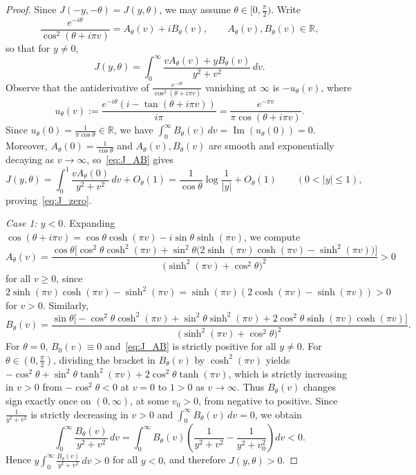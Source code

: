 \documentclass[11pt,a4paper]{amsart}
\theoremstyle{remark}
\numberwithin{equation}{section}
\newcommand{\R}{\mathbb{R}}
\begin{document}
\begin{proof}
Since $J(-y,-\theta) = J(y,\theta)$, we may assume $\theta \in [0,\frac{\pi}{2})$. Write
\[
  \frac{e^{-i\theta}}{\cos^2(\theta+i\pi v)} = A_\theta(v) + iB_\theta(v), \qquad A_\theta(v), B_\theta(v) \in \R,
\]
so that for $y \neq 0$,
\begin{equation}\label{eq:J_AB}
  J(y,\theta) = \int_0^\infty \frac{vA_\theta(v) + yB_\theta(v)}{y^2+v^2}\,dv.
\end{equation}
Observe that the antiderivative of $\frac{e^{-i\theta}}{\cos^2(\theta+i\pi v)}$ vanishing at $\infty$ is $-u_\theta(v)$, where
\begin{equation}\label{eq:u_theta}
  u_\theta(v) := \frac{e^{-i\theta}(i-\tan(\theta+i\pi v))}{i\pi} = \frac{e^{-\pi v}}{\pi\cos(\theta+i\pi v)}.
\end{equation}
Since $u_\theta(0) = \frac{1}{\pi\cos\theta} \in \R$, we have $\int_0^\infty B_\theta(v)\,dv = \operatorname{Im}(u_\theta(0)) = 0$. Moreover, $A_\theta(0) = \frac{1}{\cos\theta}$ and $A_\theta(v), B_\theta(v)$ are smooth and exponentially decaying as $v\to\infty$, so~\eqref{eq:J_AB} gives
\[
  J(y,\theta) = \int_0^1 \frac{v A_\theta(0)}{y^2+v^2}\,dv + O_\theta(1) = \frac{1}{\cos\theta}\log\frac{1}{|y|} + O_\theta(1) \qquad (0 < |y| \le 1),
\]
proving~\eqref{eq:J_zero}.

\emph{Case 1: $y < 0$.} Expanding $\cos(\theta+i\pi v) = \cos\theta\cosh(\pi v) - i\sin\theta\sinh(\pi v)$, we compute
\[
  A_\theta(v) = \frac{\cos\theta\bigl[\cos^2\theta\cosh^2(\pi v) + \sin^2\theta\bigl(2\sinh(\pi v)\cosh(\pi v) - \sinh^2(\pi v)\bigr)\bigr]}{\bigl(\sinh^2(\pi v)+\cos^2\theta\bigr)^2} > 0
\]
for all $v \ge 0$, since $2\sinh(\pi v)\cosh(\pi v) - \sinh^2(\pi v) = \sinh(\pi v)(2\cosh(\pi v)-\sinh(\pi v)) > 0$ for $v > 0$. Similarly,
\[
  B_\theta(v) = \frac{\sin\theta\bigl[-\cos^2\theta\cosh^2(\pi v) + \sin^2\theta\sinh^2(\pi v) + 2\cos^2\theta\sinh(\pi v)\cosh(\pi v)\bigr]}{\bigl(\sinh^2(\pi v)+\cos^2\theta\bigr)^2}.
\]
For $\theta = 0$, $B_0(v) \equiv 0$ and~\eqref{eq:J_AB} is strictly positive for all $y \neq 0$. For $\theta \in (0,\frac{\pi}{2})$, dividing the bracket in $B_\theta(v)$ by $\cosh^2(\pi v)$ yields $-\cos^2\theta + \sin^2\theta\tanh^2(\pi v) + 2\cos^2\theta\tanh(\pi v)$, which is strictly increasing in $v > 0$ from $-\cos^2\theta < 0$ at $v = 0$ to $1 > 0$ as $v\to\infty$. Thus $B_\theta(v)$ changes sign exactly once on $(0,\infty)$, at some $v_0 > 0$, from negative to positive. Since $\frac{1}{y^2+v^2}$ is strictly decreasing in $v > 0$ and $\int_0^\infty B_\theta(v)\,dv = 0$, we obtain
\[
  \int_0^\infty \frac{B_\theta(v)}{y^2+v^2}\,dv = \int_0^\infty B_\theta(v)\left(\frac{1}{y^2+v^2} - \frac{1}{y^2+v_0^2}\right)dv < 0.
\]
Hence $y\int_0^\infty \frac{B_\theta(v)}{y^2+v^2}\,dv > 0$ for all $y < 0$, and therefore $J(y,\theta) > 0$.


\end{proof}
\end{document}
